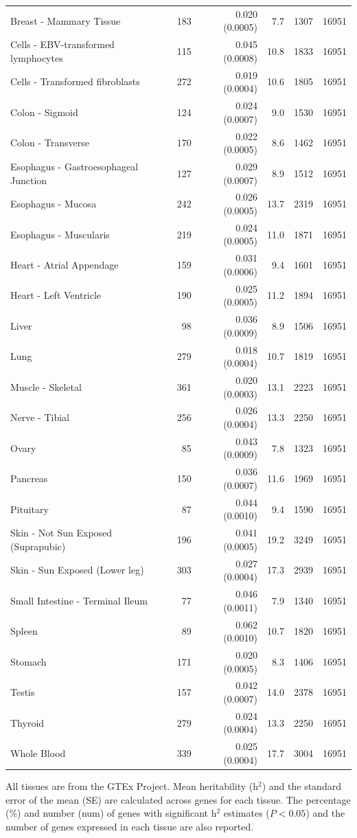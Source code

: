 \documentclass[10pt,letterpaper]{article}
\begin{document}
\begin{table}[!ht]
\begin{adjustwidth}{-2.25in}{0in}
\begin{tabular}{lrrrrr}
  Breast - Mammary Tissue & 183 & 0.020 (0.0005) & 7.7 & 1307 & 16951 \\ 
  Cells - EBV-transformed lymphocytes & 115 & 0.045 (0.0008) & 10.8 & 1833 & 16951 \\ 
  Cells - Transformed fibroblasts & 272 & 0.019 (0.0004) & 10.6 & 1805 & 16951 \\ 
  Colon - Sigmoid & 124 & 0.024 (0.0007) & 9.0 & 1530 & 16951 \\ 
  Colon - Transverse & 170 & 0.022 (0.0005) & 8.6 & 1462 & 16951 \\ 
  Esophagus - Gastroesophageal Junction & 127 & 0.029 (0.0007) & 8.9 & 1512 & 16951 \\ 
  Esophagus - Mucosa & 242 & 0.026 (0.0005) & 13.7 & 2319 & 16951 \\ 
  Esophagus - Muscularis & 219 & 0.024 (0.0005) & 11.0 & 1871 & 16951 \\ 
  Heart - Atrial Appendage & 159 & 0.031 (0.0006) & 9.4 & 1601 & 16951 \\ 
  Heart - Left Ventricle & 190 & 0.025 (0.0005) & 11.2 & 1894 & 16951 \\ 
  Liver & 98 & 0.036 (0.0009) & 8.9 & 1506 & 16951 \\ 
  Lung & 279 & 0.018 (0.0004) & 10.7 & 1819 & 16951 \\ 
  Muscle - Skeletal & 361 & 0.020 (0.0003) & 13.1 & 2223 & 16951 \\ 
  Nerve - Tibial & 256 & 0.026 (0.0004) & 13.3 & 2250 & 16951 \\ 
  Ovary & 85 & 0.043 (0.0009) & 7.8 & 1323 & 16951 \\ 
  Pancreas & 150 & 0.036 (0.0007) & 11.6 & 1969 & 16951 \\ 
  Pituitary & 87 & 0.044 (0.0010) & 9.4 & 1590 & 16951 \\ 
  Skin - Not Sun Exposed (Suprapubic) & 196 & 0.041 (0.0005) & 19.2 & 3249 & 16951 \\ 
  Skin - Sun Exposed (Lower leg) & 303 & 0.027 (0.0004) & 17.3 & 2939 & 16951 \\ 
  Small Intestine - Terminal Ileum & 77 & 0.046 (0.0011) & 7.9 & 1340 & 16951 \\ 
  Spleen & 89 & 0.062 (0.0010) & 10.7 & 1820 & 16951 \\ 
  Stomach & 171 & 0.020 (0.0005) & 8.3 & 1406 & 16951 \\ 
  Testis & 157 & 0.042 (0.0007) & 14.0 & 2378 & 16951 \\ 
  Thyroid & 279 & 0.024 (0.0004) & 13.3 & 2250 & 16951 \\ 
  Whole Blood & 339 & 0.025 (0.0004) & 17.7 & 3004 & 16951 \\ 
   \hline
\end{tabular}
\begin{flushleft} All tissues are from the GTEx Project. Mean heritability (h$^2$) and the standard error of the mean (SE) are calculated across genes for each tissue. The percentage (\%) and number (num) of genes with significant h$^2$ estimates ($P<0.05$) and the number of genes expressed in each tissue are also reported. 
\end{flushleft}
\end{adjustwidth}
\end{table}
\end{document}

